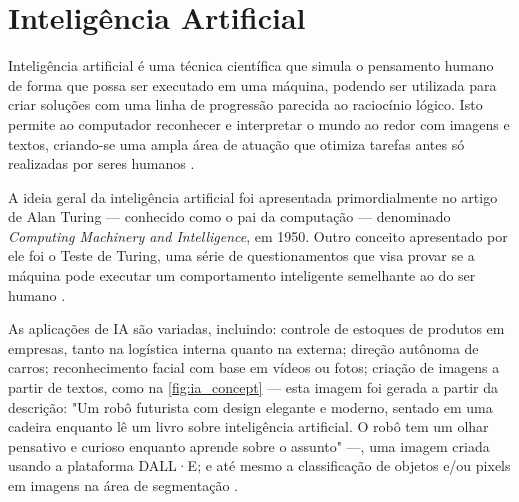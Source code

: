 \section{Inteligência Artificial}

Inteligência artificial é uma técnica científica que simula o pensamento humano de forma que possa ser executado em uma máquina, podendo ser utilizada para criar soluções com uma linha de progressão parecida ao raciocínio lógico. Isto permite ao computador reconhecer e interpretar o mundo ao redor com imagens e textos, criando-se uma ampla área de atuação que otimiza tarefas antes só realizadas por seres humanos \space\cite{ia_aliada_ou_inimiga}.



A ideia geral da inteligência artificial foi apresentada primordialmente no artigo de Alan Turing — conhecido como o pai da computação — denominado \textit{Computing Machinery and Intelligence}, em 1950. Outro conceito apresentado por ele foi o Teste de Turing, uma série de questionamentos que visa provar se a máquina pode executar um comportamento inteligente semelhante ao do ser humano \space\cite{NationalGeographic2023}.

As aplicações de IA são variadas, incluindo: controle de estoques de produtos em empresas, tanto na logística interna quanto na externa; direção autônoma de carros; reconhecimento facial com base em vídeos ou fotos; criação de imagens a partir de textos, como na \cref{fig:ia_concept} — esta imagem foi gerada a partir da descrição: "Um robô futurista com design elegante e moderno, sentado em uma cadeira enquanto lê um livro sobre inteligência artificial. O robô tem um olhar pensativo e curioso enquanto aprende sobre o assunto" —, uma imagem criada usando a plataforma DALL·E; e até mesmo a classificação de objetos e/ou pixels em imagens na área de segmentação \space\cite{Stefanini, OpenAI2021}.

